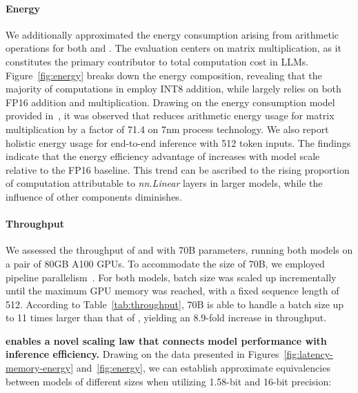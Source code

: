 \paragraph{Energy}

We additionally approximated the energy consumption arising from arithmetic operations for both  and . The evaluation centers on matrix multiplication, as it constitutes the primary contributor to total computation cost in LLMs. Figure~\ref{fig:energy} breaks down the energy composition, revealing that the majority of computations in  employ INT8 addition, while  largely relies on both FP16 addition and multiplication. Drawing on the energy consumption model provided in~\cite{energycost, pokebnn}, it was observed that  reduces arithmetic energy usage for matrix multiplication by a factor of 71.4 on 7nm process technology. We also report holistic energy usage for end-to-end inference with 512 token inputs. The findings indicate that the energy efficiency advantage of  increases with model scale relative to the FP16  baseline. This trend can be ascribed to the rising proportion of computation attributable to \emph{nn.Linear} layers in larger models, while the influence of other components diminishes.

\paragraph{Throughput}

We assessed the throughput of  and  with 70B parameters, running both models on a pair of 80GB A100 GPUs. To accommodate the size of  70B, we employed pipeline parallelism~\cite{gpipe}. For both models, batch size was scaled up incrementally until the maximum GPU memory was reached, with a fixed sequence length of 512. According to Table~\ref{tab:throughput},  70B is able to handle a batch size up to 11 times larger than that of , yielding an 8.9-fold increase in throughput.

\textbf{ enables a novel scaling law that connects model performance with inference efficiency.} Drawing on the data presented in Figures~\ref{fig:latency-memory-energy} and~\ref{fig:energy}, we can establish approximate equivalencies between models of different sizes when utilizing 1.58-bit and 16-bit precision:


